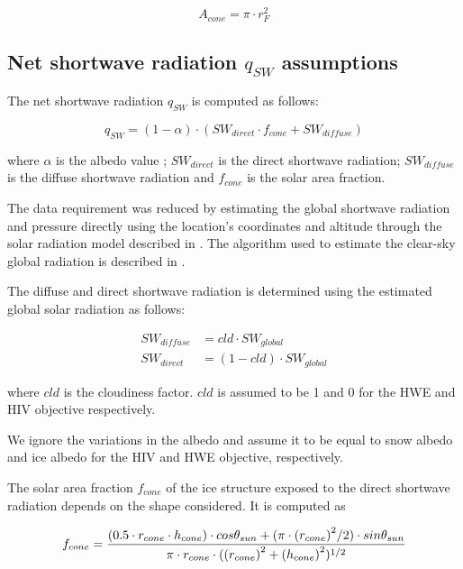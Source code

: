 \documentclass[tc, manuscript]{copernicus}
\begin{document}
\begin{equation} A_{cone} =\pi \cdot r_{F}^2  \end{equation}

\subsection{Net shortwave radiation \texorpdfstring{$q_{SW}$}{Lg} assumptions}
\label{sec:SW}

The net shortwave radiation $q_{SW}$ is computed as follows:

\begin{equation} 
q_{SW} = (1- \alpha) \cdot ( SW_{direct} \cdot f_{cone} + SW_{diffuse})
\label{eqn:SW} 
\end{equation}

where $\alpha$ is the albedo value ; $SW_{direct}$ is the direct shortwave radiation; $SW_{diffuse}$ is the
diffuse shortwave radiation and $f_{cone}$ is the solar area fraction.

The data requirement was reduced by estimating the global shortwave radiation and pressure directly using the
location's coordinates and altitude through the solar radiation model described in
\citet{holmgrenPvlibPythonPython2018}. The algorithm used to estimate the clear-sky global radiation is
described in \citet{ineichenBroadbandSimplifiedVersion2008}.  

The diffuse and direct shortwave radiation is determined using the estimated global solar radiation as follows:

\begin{equation}
\begin{split}
  SW_{diffuse} &= cld \cdot SW_{global}\\
  SW_{direct} &= (1-cld) \cdot SW_{global}
\end{split}
\end{equation}

where $cld$ is the cloudiness factor. $cld$ is assumed to be 1 and 0 for the HWE and HIV objective
respectively.

We ignore the variations in the albedo and assume it to be equal to snow albedo and ice albedo for the HIV and
HWE objective, respectively.

The solar area fraction $f_{cone}$ of the ice structure exposed to the direct shortwave radiation depends on the
shape considered. It is computed as

\begin{equation}
		f_{cone} =\frac{(0.5 \cdot r_{cone} \cdot h_{cone}) \cdot cos \theta_{sun} +(\pi \cdot
			{(r_{cone})}^2/2) \cdot sin \theta_{sun} }{\pi \cdot r_{cone} \cdot ({(r_{cone})}^2+{(h_{cone})}^2)^{1/2}}\\
\end{equation}
\end{document}
